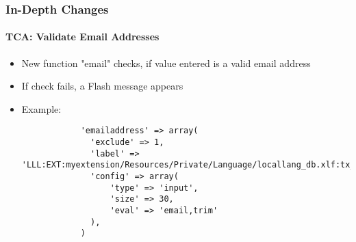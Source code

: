 \begin{frame}[fragile]
	\frametitle{In-Depth Changes}
	\framesubtitle{TCA: Validate Email Addresses}

	\lstset{
		basicstyle=\tiny\ttfamily
	}

	\begin{itemize}

		\item New function "email" checks, if value entered is a valid email address
		\item If check fails, a Flash message appears
		\item Example:

		\begin{lstlisting}
			'emailaddress' => array(
			  'exclude' => 1,
			  'label' => 'LLL:EXT:myextension/Resources/Private/Language/locallang_db.xlf:tx_myextension
		 	  'config' => array(
			      'type' => 'input',
			      'size' => 30,
			      'eval' => 'email,trim'
			  ),
			)
		\end{lstlisting}

	\end{itemize}

\end{frame}


